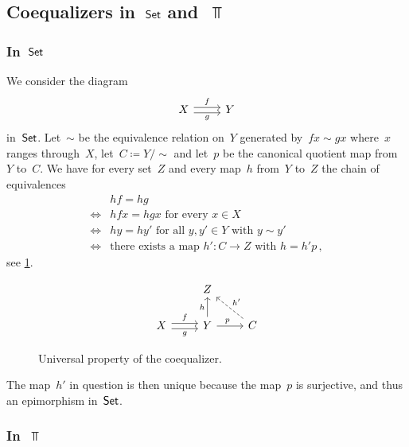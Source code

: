 \subsection{Coequalizers in~\texorpdfstring{$\mathsf{Set}$}{Set} and~\texorpdfstring{$\Top$}{Top}}



\subsubsection{In~\texorpdfstring{$\mathsf{Set}$}{Set}}

We consider the diagram
\begin{equation}
	\label{coequalizer diagram}
	\begin{tikzcd}
		X
		\arrow[shift left]{r}[above]{f}
		\arrow[shift right]{r}[below]{g}
		&
		Y
	\end{tikzcd}
\end{equation}
in~$\mathsf{Set}$.
Let~$∼$ be the equivalence relation on~$Y$ generated by~$f x ∼ g x$ where~$x$ ranges through~$X$, let~$C ≔ Y / {∼}$ and let~$p$ be the canonical quotient map from~$Y$ to~$C$.
We have for every set~$Z$ and every map~$h$ from~$Y$ to~$Z$ the chain of equivalences
\begin{align*}
	{}&
	h f = h g \\
	\iff{}&
	\text{$h f x = h g x$ for every~$x ∈ X$} \\
	\iff{}&
	\text{$h y = h y'$ for all~$y, y' ∈ Y$ with~$y ∼ y'$} \\
	\iff{}&
	\text{there exists a map~$h' \colon C \to Z$ with~$h = h' p$} \,,
\end{align*}
see \cref{universal property of coequalizer as diagram}.
\begin{figure}
	\[
		\begin{tikzcd}
			{}
			&
			Z
			&
			{}
			\\
			X
			\arrow[shift left]{r}[above]{f}
			\arrow[shift right]{r}[below]{g}
			&
			Y
			\arrow{u}[left]{h}
			\arrow{r}[above, pos = 0.4]{p}
			&
			C
			\arrow[dashed]{ul}[above right]{h'}
		\end{tikzcd}
	\]
	\caption{Universal property of the coequalizer.}
	\label{universal property of coequalizer as diagram}
\end{figure}
The map~$h'$ in question is then unique because the map~$p$ is surjective, and thus an epimorphism in~$\mathsf{Set}$.



\subsubsection{In~\texorpdfstring{$\Top$}{Top}}

